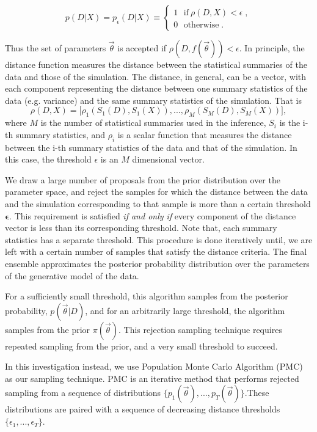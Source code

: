 \documentclass[12pt, preprint]{aastex}
\newcommand{\beq}{\begin{equation}}
\newcommand{\eeq}{\end{equation}}
\newcommand{\pars}{\vec{\theta}}
\begin{document}
\beq 
p(D|X) = p_{\epsilon}(D|X) \equiv \begin{cases}
                                    1 \ \ \  \mathrm{if} \ \rho(D,X)<\epsilon \; , \\
                                    0 \ \ \ \mathrm{otherwise} \; .
                                    \end{cases}
\eeq 

Thus the set of parameters $\pars$ is accepted if $\rho(D,f(\pars))<\epsilon$. In principle, the distance function measures the distance 
between the statistical summaries of the data and those of the simulation. 
The distance, in general, can be a vector, with each component representing the distance between one summary statistics of the data (e.g. variance) and the same summary statistics of the simulation. That is
\beq 
\rho(D,X) = \Big[\rho_{1}(S_{1}(D) , S_{1}(X)), ... , \rho_{M}(S_{M}(D) , S_{M}(X)) \Big],
\eeq 
where $M$ is the number of statistical summaries used in the inference, $S_{i}$ is the i-th summary statistics, and $\rho_{i}$ is a scalar function that measures the distance between the i-th summary statistics of the data and that of the simulation. In this case, the threshold $\epsilon$ is an $M$ dimensional vector.

We draw a large number of proposals from the prior distribution over the parameter space, 
and reject the samples for which the distance between the data and the simulation corresponding to that 
sample is more than a certain threshold $\bm{\epsilon}$. This requirement is satisfied \emph{if and only if}
every component of the distance vector is less than its corresponding threshold. Note that, each summary statistics 
has a separate threshold. This procedure is done iteratively until, we are left with a certain number
of samples that satisfy the distance criteria. The final ensemble approximates the posterior probability distribution over the parameters of the generative model of the data.

For a sufficiently small threshold, this algorithm samples from the posterior probability, $p(\pars | D)$, and for an arbitrarily large threshold, the algorithm samples from the prior $\pi(\pars)$. This rejection sampling technique requires repeated sampling from the prior, and a very small threshold to succeed.

In this investigation instead, we use Population Monte Carlo Algorithm (PMC) as our sampling technique. PMC is an iterative method that performs rejected sampling from a sequence of distributions $\{p_{1}(\pars),...,p_{T}(\pars)\}$.These distributions are paired with a sequence of decreasing distance thresholds $\{\epsilon_{1} , ... , \epsilon_{T}\}$.
\end{document}
